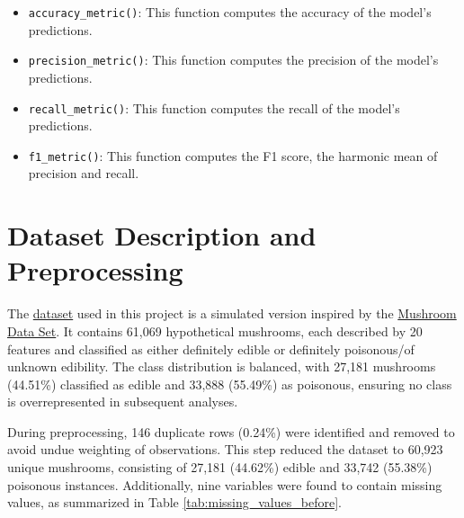 \documentclass{article}
\begin{document}
\begin{itemize}
    \item \texttt{accuracy\_metric()}: 
    This function computes the accuracy of the model’s predictions.

    \item \texttt{precision\_metric()}: 
    This function computes the precision of the model’s predictions.

    \item \texttt{recall\_metric()}: 
    This function computes the recall of the model’s predictions.

    \item \texttt{f1\_metric()}: 
    This function computes the F1 score, the harmonic mean of precision and recall.

\end{itemize}

\section{Dataset Description and Preprocessing}

The \href{https://archive.ics.uci.edu/dataset/848/secondary+mushroom+dataset}{dataset} used in this project is a simulated version inspired by the \href{https://archive.ics.uci.edu/dataset/73/mushroom}{Mushroom Data Set}. It contains 61,069 hypothetical mushrooms, each described by 20 features and classified as either definitely edible or definitely poisonous/of unknown edibility. The class distribution is balanced, with 27,181 mushrooms (44.51\%) classified as edible and 33,888 (55.49\%) as poisonous, ensuring no class is overrepresented in subsequent analyses.

During preprocessing, 146 duplicate rows (0.24\%) were identified and removed to avoid undue weighting of observations. This step reduced the dataset to 60,923 unique mushrooms, consisting of 27,181 (44.62\%) edible and 33,742 (55.38\%) poisonous instances. Additionally, nine variables were found to contain missing values, as summarized in Table \ref{tab:missing_values_before}.
\end{document}
